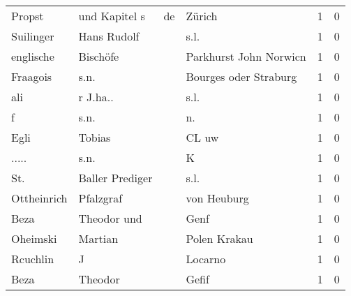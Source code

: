 \begin{center}
\begin{tiny}
\begin{longtabu}{llllrr}
                   Propst &                      und Kapitel s &          de &                                      Zürich &          1 &         0 \\
                Suilinger &                        Hans Rudolf &             &                                        s.l. &          1 &         0 \\
                englische &                           Bischöfe &             &                      Parkhurst John Norwicn &          1 &         0 \\
                 Fraagois &                               s.n. &             &                       Bourges oder Straburg &          1 &         0 \\
                      ali &                           r J.ha.. &             &                                        s.l. &          1 &         0 \\
                        f &                               s.n. &             &                                         n.  &          1 &         0 \\
                     Egli &                             Tobias &             &                                       CL uw &          1 &         0 \\
                    ..... &                               s.n. &             &                                           K &          1 &         0 \\
                      St. &                    Baller Prediger &             &                                        s.l. &          1 &         0 \\
              Ottheinrich &                          Pfalzgraf &             &                                 von Heuburg &          1 &         0 \\
                     Beza &                        Theodor und &             &                                        Genf &          1 &         0 \\
                 Oheimski &                            Martian &             &                                Polen Krakau &          1 &         0 \\
                 Rcuchlin &                                  J &             &                                     Locarno &          1 &         0 \\
                     Beza &                            Theodor &             &                                       Gefif &          1 &         0 \\

\end{longtabu}
\end{tiny}
\end{center}
